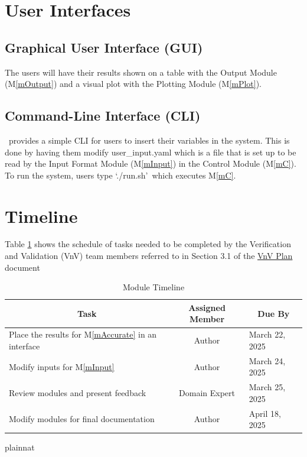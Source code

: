 \documentclass[12pt, titlepage]{article}
\begin{document}
\section{User Interfaces}
\subsection{Graphical User Interface (GUI)}
The users will have their results shown on a table with the Output Module (M\ref{mOutput}) and a visual plot with the Plotting Module (M\ref{mPlot}).

\subsection{Command-Line Interface (CLI)}
\progname~provides a simple CLI for users to insert their variables in the system. This is done by having them modify user\_input.yaml which is a file that is set up to be read by the Input Format Module (M\ref{mInput}) in the Control Module (M\ref{mC}). To run the system, users type \lq./run.sh\rq~which executes M\ref{mC}.



\section{Timeline}
Table \ref{TblTimeline} shows the schedule of tasks needed to be completed by the Verification and Validation (VnV) team members referred to in Section 3.1 of the  \hyperlink{https://github.com/AliyahJimoh/2D-Localizer/blob/main/docs/VnVPlan/VnVPlan.pdf}{VnV Plan} document
\newpage

\begin{table}[H]
  \centering
  \renewcommand{\arraystretch}{1.2} %
  \begin{tabular}{|l|c|l|}
      \hline
      \multicolumn{1}{|c|}{\textbf{Task}} & \multicolumn{1}{c|}{\textbf{Assigned Member}} & \multicolumn{1}{c|}{\textbf{Due By}} \\ 
      \hline
      Place the results for M\ref{mAccurate} in an interface & Author & March 22, 2025 \\ 
      \hline
      Modify inputs for M\ref{mInput} & Author & March 24, 2025 \\ 
      \hline
      Review modules and present feedback & Domain Expert & March 25, 2025 \\ 
      \hline
      Modify modules for final documentation & Author & April 18, 2025 \\ 
      \hline
  \end{tabular}
  \caption{Module Timeline}
  \label{TblTimeline}
\end{table}

\newpage{}
 {plainnat}


\newpage{}
\end{document}
